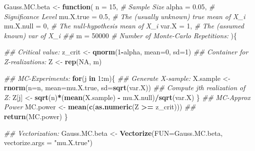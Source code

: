 \documentclass[]{book}
\newenvironment{Shaded}{\begin{snugshade}}{\end{snugshade}}
\newcommand{\CommentTok}[1]{\textcolor[rgb]{0.56,0.35,0.01}{\textit{#1}}}
\newcommand{\ControlFlowTok}[1]{\textcolor[rgb]{0.13,0.29,0.53}{\textbf{#1}}}
\newcommand{\DataTypeTok}[1]{\textcolor[rgb]{0.13,0.29,0.53}{#1}}
\newcommand{\DecValTok}[1]{\textcolor[rgb]{0.00,0.00,0.81}{#1}}
\newcommand{\FloatTok}[1]{\textcolor[rgb]{0.00,0.00,0.81}{#1}}
\newcommand{\KeywordTok}[1]{\textcolor[rgb]{0.13,0.29,0.53}{\textbf{#1}}}
\newcommand{\NormalTok}[1]{#1}
\newcommand{\OperatorTok}[1]{\textcolor[rgb]{0.81,0.36,0.00}{\textbf{#1}}}
\newcommand{\OtherTok}[1]{\textcolor[rgb]{0.56,0.35,0.01}{#1}}
\newcommand{\StringTok}[1]{\textcolor[rgb]{0.31,0.60,0.02}{#1}}
\theoremstyle{definition}
\theoremstyle{definition}
\theoremstyle{definition}
\theoremstyle{remark}
\begin{document}
\begin{Shaded}
\begin{Highlighting}[]
\NormalTok{Gauss.MC.beta <-}\StringTok{ }\ControlFlowTok{function}\NormalTok{(}
    \DataTypeTok{n         =} \DecValTok{15}\NormalTok{,    }\CommentTok{# Sample Size}
    \DataTypeTok{alpha     =}  \FloatTok{0.05}\NormalTok{, }\CommentTok{# Significance Level}
    \DataTypeTok{mu.X.true =}  \FloatTok{0.5}\NormalTok{,  }\CommentTok{# The (usually unknown) true mean of X_i}
    \DataTypeTok{mu.X.null =}  \DecValTok{0}\NormalTok{,    }\CommentTok{# The null-hypothesis mean of X_i}
    \DataTypeTok{var.X     =}  \DecValTok{1}\NormalTok{,    }\CommentTok{# The (assumed known)  var of X_i}
    \CommentTok{##}
    \DataTypeTok{m         =} \DecValTok{50000}  \CommentTok{# Number of Monte-Carlo Repetitions:}
\NormalTok{    )\{}

  \CommentTok{## Critical value:}
\NormalTok{  z_crit <-}\StringTok{ }\KeywordTok{qnorm}\NormalTok{(}\DecValTok{1}\OperatorTok{-}\NormalTok{alpha, }\DataTypeTok{mean=}\DecValTok{0}\NormalTok{, }\DataTypeTok{sd=}\DecValTok{1}\NormalTok{)}
  \CommentTok{## Container for Z-realizations:}
\NormalTok{  Z         <-}\StringTok{ }\KeywordTok{rep}\NormalTok{(}\OtherTok{NA}\NormalTok{, m)}

  \CommentTok{## MC-Experiments:}
  \ControlFlowTok{for}\NormalTok{(j }\ControlFlowTok{in} \DecValTok{1}\OperatorTok{:}\NormalTok{m)\{}
    \CommentTok{## Generate X-sample:}
\NormalTok{    X.sample <-}\StringTok{ }\KeywordTok{rnorm}\NormalTok{(}\DataTypeTok{n=}\NormalTok{n, }\DataTypeTok{mean=}\NormalTok{mu.X.true, }\DataTypeTok{sd=}\KeywordTok{sqrt}\NormalTok{(var.X))}
    \CommentTok{## Compute jth realization of Z:}
\NormalTok{    Z[j]     <-}\StringTok{ }\KeywordTok{sqrt}\NormalTok{(n)}\OperatorTok{*}\NormalTok{(}\KeywordTok{mean}\NormalTok{(X.sample) }\OperatorTok{-}\StringTok{ }\NormalTok{mu.X.null)}\OperatorTok{/}\KeywordTok{sqrt}\NormalTok{(var.X)}
\NormalTok{  \}}
  \CommentTok{## MC-Approx Power}
\NormalTok{  MC.power <-}\StringTok{ }\KeywordTok{mean}\NormalTok{(}\KeywordTok{c}\NormalTok{(}\KeywordTok{as.numeric}\NormalTok{(Z }\OperatorTok{>=}\StringTok{ }\NormalTok{z_crit)))}
  \CommentTok{##}
  \KeywordTok{return}\NormalTok{(MC.power)}
\NormalTok{\}}

\CommentTok{## Vectorization:}
\NormalTok{Gauss.MC.beta <-}\StringTok{ }\KeywordTok{Vectorize}\NormalTok{(}\DataTypeTok{FUN=}\NormalTok{Gauss.MC.beta, }\DataTypeTok{vectorize.args =} \StringTok{"mu.X.true"}\NormalTok{)}
\end{Highlighting}
\end{Shaded}
\end{document}
